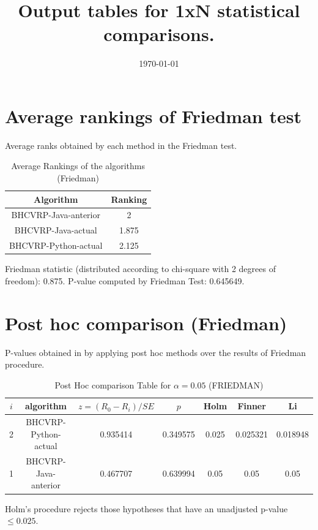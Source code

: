\documentclass[a4paper,10pt]{article}
\title{Output tables for 1xN statistical comparisons.}
\author{}
\date{\today}
\begin{document}
\begin{landscape}
\pagestyle{empty}
\maketitle
\thispagestyle{empty}

\section{Average rankings of Friedman test}


Average ranks obtained by each method in the Friedman test.

\begin{table}[!htp]
\centering
\begin{tabular}{|c|c|}\hline
Algorithm&Ranking\\\hline
BHCVRP-Java-anterior&2\\BHCVRP-Java-actual&1.875\\BHCVRP-Python-actual&2.125\\\hline\end{tabular}
\caption{Average Rankings of the algorithms (Friedman)}
\end{table}

Friedman statistic (distributed according to chi-square with 2 degrees of freedom): 0.875. \newline P-value computed by Friedman Test: 0.645649.\newline


\newpage

\section{Post hoc comparison (Friedman)}


P-values obtained in by applying post hoc methods over the results of Friedman procedure.

\begin{table}[!htp]
\centering\footnotesize
\begin{tabular}{ccccccc}
$i$&algorithm&$z=(R_0 - R_i)/SE$&$p$&Holm &Finner&Li\\
\hline2&BHCVRP-Python-actual&0.935414&0.349575&0.025&0.025321&0.018948\\1&BHCVRP-Java-anterior&0.467707&0.639994&0.05&0.05&0.05\\\hline
\end{tabular}
\caption{Post Hoc comparison Table for $\alpha=0.05$ (FRIEDMAN)}
\end{table}Holm's procedure rejects those hypotheses that have an unadjusted p-value $\le0.025$.


\end{landscape}
\end{document}
